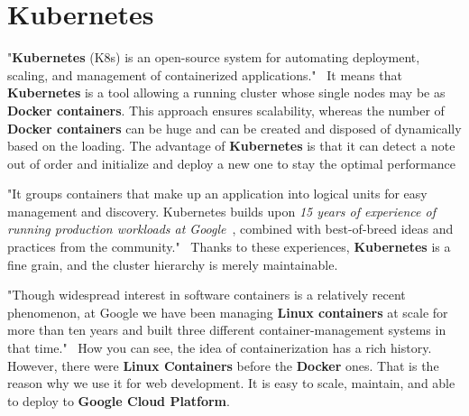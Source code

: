 \section{Kubernetes}\label{sec:kubernetes}
"\textbf{Kubernetes} (K8s) is an open-source system for automating deployment, scaling, and management of containerized applications."~\cite{kubernetes}
It means that \textbf{Kubernetes} is a tool allowing a running cluster whose single nodes may be as \textbf{Docker containers}.
This approach ensures scalability, whereas the number of \textbf{Docker containers} can be huge and can be created and disposed of dynamically based on the loading.
The advantage of \textbf{Kubernetes} is that it can detect a note out of order and initialize and deploy a new one to stay the optimal performance

"It groups containers that make up an application into logical units for easy management and discovery.
Kubernetes builds upon \textit{15 years of experience of running production workloads at Google}~\cite{kubernetesArticle}, combined with best-of-breed ideas and practices from the community."~\cite{kubernetes}
Thanks to these experiences, \textbf{Kubernetes} is a fine grain, and the cluster hierarchy is merely maintainable.

"Though widespread interest in software containers is a relatively recent phenomenon, at Google we have been managing \textbf{Linux containers} at scale for more than ten years and built three different container-management systems in that time."~\cite{kubernetesArticle}
How you can see, the idea of containerization has a rich history.
However, there were \textbf{Linux Containers} before the \textbf{Docker} ones.
That is the reason why we use it for web development.
It is easy to scale, maintain, and able to deploy to \textbf{Google Cloud Platform}.